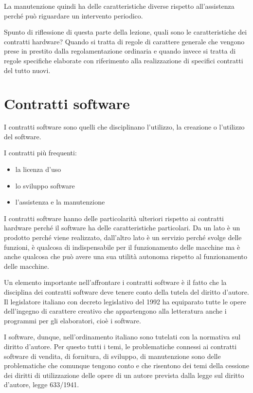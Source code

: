 La manutenzione quindi ha delle caratteristiche diverse rispetto all'assistenza perché può riguardare un intervento periodico. 

Spunto di riflessione di questa parte della lezione, quali sono le caratteristiche dei contratti hardware? Quando si tratta di regole di carattere generale che vengono prese in prestito dalla regolamentazione ordinaria e quando invece si tratta di regole specifiche elaborate con riferimento alla realizzazione di specifici contratti del tutto nuovi. 

\section{Contratti software}

I contratti software sono quelli che disciplinano l'utilizzo, la creazione o l'utilizzo del software. 

I contratti più frequenti: 
\begin{itemize}
    \item la licenza d'uso
    \item lo sviluppo software
    \item l'assistenza e la manutenzione
\end{itemize}

I contratti software hanno delle particolarità ulteriori rispetto ai contratti hardware perché il software ha delle caratteristiche particolari. Da un lato è un prodotto perché viene realizzato, dall'altro lato è un servizio perché svolge delle funzioni, è qualcosa di indispensabile per il funzionamento delle macchine ma è anche qualcosa che può avere una sua utilità autonoma rispetto al funzionamento delle macchine. 

Un elemento importante nell'affrontare i contratti software è il fatto che la disciplina dei contratti software deve tenere conto della tutela del diritto d'autore. Il legislatore italiano con decreto legislativo del 1992 ha equiparato tutte le opere dell'ingegno di carattere creativo che appartengono alla letteratura anche i programmi per gli elaboratori, cioè i software. 

I software, dunque, nell'ordinamento italiano sono tutelati con la normativa sul diritto d'autore. Per questo tutti i temi, le problematiche connessi ai contratti software di vendita, di fornitura, di sviluppo, di manutenzione sono delle problematiche che comunque tengono conto e che risentono dei temi della cessione dei diritti di utilizzazione delle opere di un autore prevista dalla legge sul diritto d'autore, legge 633/1941. 

